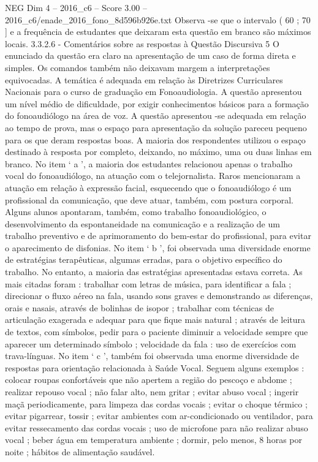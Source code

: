 \begin{textsample}{NEG Dim 4 – 2016\_c6 – Score 3.00 – 2016\_c6/enade\_2016\_fono\_8d596b926e.txt}
Observa -se que o intervalo ( 60 ; 70 ] e a frequência de estudantes que deixaram esta questão em branco são máximos locais. 3.3.2.6 - Comentários sobre as respostas à Questão Discursiva 5 O enunciado da questão era claro na apresentação de um caso de forma direta e simples.
Os comandos também não deixavam margem a interpretações equivocadas.
A temática é adequada em relação às Diretrizes Curriculares Nacionais para o curso de graduação em Fonoaudiologia.
A questão apresentou um nível médio de dificuldade, por exigir conhecimentos básicos para a formação do fonoaudiólogo na área de voz.
A questão apresentou -se adequada em relação ao tempo de prova, mas o espaço para apresentação da solução pareceu pequeno para os que deram respostas boas.
A maioria dos respondentes utilizou o espaço destinado à resposta por completo, deixando, no máximo, uma ou duas linhas em branco.
No item ‘ a ’, a maioria dos estudantes relacionou apenas o trabalho vocal do fonoaudiólogo, na atuação com o telejornalista.
Raros mencionaram a atuação em relação à expressão facial, esquecendo que o fonoaudiólogo é um profissional da comunicação, que deve atuar, também, com postura corporal.
Alguns alunos apontaram, também, como trabalho fonoaudiológico, o desenvolvimento da espontaneidade na comunicação e a realização de um trabalho preventivo e de aprimoramento do bem-estar do profissional, para evitar o aparecimento de disfonias.
No item ‘ b ’, foi observada uma diversidade enorme de estratégias terapêuticas, algumas erradas, para o objetivo específico do trabalho.
No entanto, a maioria das estratégias apresentadas estava correta.
As mais citadas foram : trabalhar com letras de música, para identificar a fala ; direcionar o fluxo aéreo na fala, usando sons graves e demonstrando as diferenças, orais e nasais, através de bolinhas de isopor ; trabalhar com técnicas de articulação exagerada e adequar para que fique mais natural ; através de leitura de textos, com símbolos, pedir para o paciente diminuir a velocidade sempre que aparecer um determinado símbolo ; velocidade da fala : uso de exercícios com trava-línguas.
No item ‘ c ’, também foi observada uma enorme diversidade de respostas para orientação relacionada à Saúde Vocal.
Seguem alguns exemplos : colocar roupas confortáveis que não apertem a região do pescoço e abdome ; realizar repouso vocal ; não falar alto, nem gritar ; evitar abuso vocal ; ingerir maçã periodicamente, para limpeza das cordas vocais ; evitar o choque térmico ; evitar pigarrear, tossir ; evitar ambientes com ar-condicionado ou ventilador, para evitar ressecamento das cordas vocais ; uso de microfone para não realizar abuso vocal ; beber água em temperatura ambiente ; dormir, pelo menos, 8 horas por noite ; hábitos de alimentação saudável.

\end{textsample}
